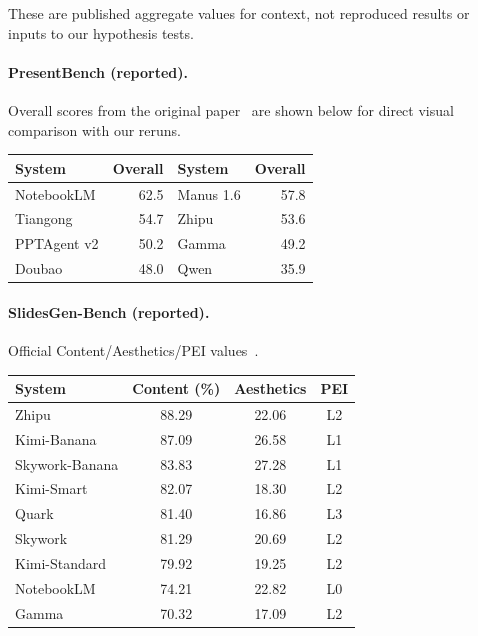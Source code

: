 These are published aggregate values for context, not reproduced results or inputs to our hypothesis tests.

\paragraph{PresentBench (reported).} Overall scores from the original paper~\citep{chen2026presentbench} are shown below for direct visual comparison with our reruns.
\begin{center}\small
\begin{tabular}{lrlr}
\toprule System & Overall & System & Overall \\
\midrule
NotebookLM & 62.5 & Manus 1.6 & 57.8 \\
Tiangong & 54.7 & Zhipu & 53.6 \\
PPTAgent v2 & 50.2 & Gamma & 49.2 \\
Doubao & 48.0 & Qwen & 35.9 \\
\bottomrule
\end{tabular}
\end{center}

\paragraph{SlidesGen-Bench (reported).} Official Content/Aesthetics/PEI values~\citep{yang2026slidesgenbench}.
\begin{center}\small
\begin{tabular}{lccc}
\toprule System & Content (\%) & Aesthetics & PEI \\
\midrule
Zhipu & 88.29 & 22.06 & L2 \\
Kimi-Banana & 87.09 & 26.58 & L1 \\
Skywork-Banana & 83.83 & 27.28 & L1 \\
Kimi-Smart & 82.07 & 18.30 & L2 \\
Quark & 81.40 & 16.86 & L3 \\
Skywork & 81.29 & 20.69 & L2 \\
Kimi-Standard & 79.92 & 19.25 & L2 \\
NotebookLM & 74.21 & 22.82 & L0 \\
Gamma & 70.32 & 17.09 & L2 \\
\bottomrule
\end{tabular}
\end{center}

